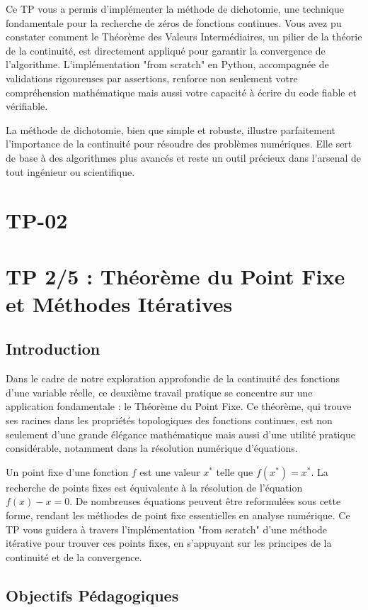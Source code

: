 \documentclass[12pt,a4paper]{report}
\begin{document}
Ce TP vous a permis d'implémenter la méthode de dichotomie, une technique fondamentale pour la recherche de zéros de fonctions continues. Vous avez pu constater comment le Théorème des Valeurs Intermédiaires, un pilier de la théorie de la continuité, est directement appliqué pour garantir la convergence de l'algorithme. L'implémentation "from scratch" en Python, accompagnée de validations rigoureuses par assertions, renforce non seulement votre compréhension mathématique mais aussi votre capacité à écrire du code fiable et vérifiable.

La méthode de dichotomie, bien que simple et robuste, illustre parfaitement l'importance de la continuité pour résoudre des problèmes numériques. Elle sert de base à des algorithmes plus avancés et reste un outil précieux dans l'arsenal de tout ingénieur ou scientifique.

\section{TP-02}
\section{TP 2/5 : Théorème du Point Fixe et Méthodes Itératives}

\subsection{Introduction}

Dans le cadre de notre exploration approfondie de la continuité des fonctions d'une variable réelle, ce deuxième travail pratique se concentre sur une application fondamentale : le Théorème du Point Fixe. Ce théorème, qui trouve ses racines dans les propriétés topologiques des fonctions continues, est non seulement d'une grande élégance mathématique mais aussi d'une utilité pratique considérable, notamment dans la résolution numérique d'équations.

Un point fixe d'une fonction $f$ est une valeur $x^*$ telle que $f(x^*) = x^*$. La recherche de points fixes est équivalente à la résolution de l'équation $f(x) - x = 0$. De nombreuses équations peuvent être reformulées sous cette forme, rendant les méthodes de point fixe essentielles en analyse numérique. Ce TP vous guidera à travers l'implémentation "from scratch" d'une méthode itérative pour trouver ces points fixes, en s'appuyant sur les principes de la continuité et de la convergence.

\subsection{Objectifs Pédagogiques}
\end{document}
